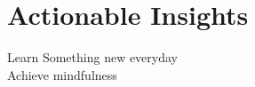 \section*{Actionable Insights}
\begin{Form}
  \CheckBox[name=1]{} Learn Something new everyday\\
  \CheckBox[name=2]{} Achieve mindfulness 
\end{Form}